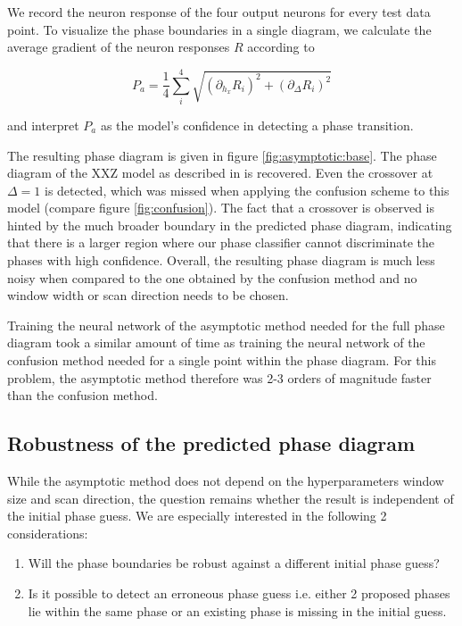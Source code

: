\documentclass[prl, reprint, twocolumn]{revtex4-1}
\begin{document}
	We record the neuron response of the four output neurons for every test data point. To visualize the phase boundaries in a single diagram, we calculate the average gradient of the neuron responses $R$ according to
	
	\begin{equation}
		P_a = \frac{1}{4} \sum_{i}^4 \sqrt{(\partial_{h_x} R_i)^2 + (\partial_{\Delta} R_i)^2}
		\label{eq:Pa}
	\end{equation}
	
	and interpret $P_a$ as the model's confidence in detecting a phase transition.
	
	
	The resulting phase diagram is given in figure \ref{fig:asymptotic:base}. The phase diagram of the XXZ model as described in \cite{Dmitriev2002} is recovered. Even the crossover at $\Delta=1$ is detected, which was missed when applying the confusion scheme to this model (compare figure \ref{fig:confusion}). The fact that a crossover is observed is hinted by the much broader boundary in the predicted phase diagram, indicating that there is a larger region where our phase classifier cannot discriminate the phases with high confidence.  Overall, the resulting phase diagram is much less noisy when compared to the one obtained by the confusion method and no window width or scan direction needs to be chosen.
	
	Training the neural network of the asymptotic method needed for the full phase diagram took a similar amount of time as training the neural network of the confusion method needed for a single point within the phase diagram. For this problem, the asymptotic method therefore was 2-3 orders of magnitude faster than the confusion method.
 	
	\subsection{Robustness of the predicted phase diagram}
	While the asymptotic method does not depend on the hyperparameters window size and scan direction, the question remains whether the result is independent of the initial phase guess. We are especially interested in the following 2 considerations:
	\begin{enumerate}
		\item Will the phase boundaries be robust against a different initial phase guess?
		\item Is it possible to detect an erroneous phase guess i.e. either 2 proposed phases lie within the same phase or an existing phase is missing in the initial guess.
	\end{enumerate}
\end{document}
